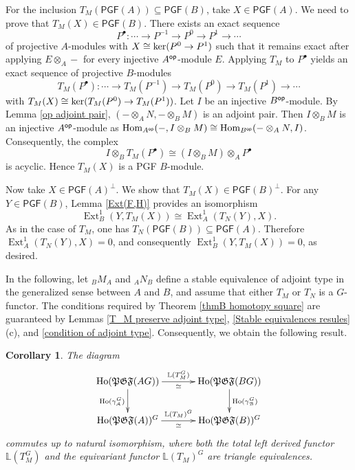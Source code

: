 \documentclass[12pt,twoside]{amsart}
\theoremstyle{bfupright head,slanted body}
\theoremstyle{bfupright head,upright body}
\theoremstyle{fixed bf head,slanted body}
\newtheorem{cor}[res]{Corollary}        \newtheorem*{cor*}{Corollary}
\theoremstyle{fixed bf head,upright body}
\theoremstyle{numbered paragraph}
\newenvironment{prf*}[1][Proof]{%
  \begin{proof}[\bf #1]
    \setcounter{equation}{0}
    \renewcommand{\theequation}{\arabic{equation}}}
  {\end{proof}
}
\numberwithin{equation}{res}
\newcommand{\calA}{\mathcal{A}}
\newcommand{\calB}{\mathcal{B}}
\newcommand{\PGF}{\mathsf{PGF}}
\newcommand{\Ho}{\mathrm{Ho}}
\newcommand{\op}{\sf op}
\newcommand{\kernel}{\mbox{\rm ker}}
\newcommand{\Hom}{\operatorname{Hom}}
\newcommand{\Ext}{\operatorname{Ext}}
\begin{document}
\begin{prf*}
For the inclusion $T_M(\PGF(A)) \subseteq \PGF(B)$, take $X \in \PGF(A)$.
We need to prove that $T_M(X) \in \PGF(B)$.
There exists an exact sequence
\[
P^\bullet: \cdots \to P^{-1} \to P^0 \to P^1 \to \cdots
\]
of projective $A$-modules with $X \cong \kernel(P^0 \to P^1)$ such that it remains exact after applying $E\otimes_A-$ for every injective $A^{\op}$-module $E$.
Applying $T_M$ to $P^\bullet$ yields an exact sequence of projective $B$-modules
\[
T_M(P^\bullet): \cdots \to T_M(P^{-1}) \to T_M(P^0) \to T_M(P^1) \to \cdots
\]
with $T_M(X) \cong \kernel(T_M(P^0) \to T_M(P^1))$.
Let $I$ be an injective $B^{\op}$-module.
By Lemma \ref{op adjoint pair}, $(- \otimes_A N, - \otimes_B M)$ is an adjoint pair.
Then $I\otimes_BM$ is an injective $A^{\op}$-module as $\Hom_{A^{\op}}(-, I \otimes_B M) \cong \Hom_{B^{\op}}(- \otimes_A N, I)$.
Consequently, the complex
\[
I \otimes_B T_M(P^\bullet) \cong (I \otimes_B M) \otimes_A P^\bullet
\]
is acyclic.
Hence $T_M(X)$ is a PGF $B$-module.

Now take $X \in \PGF(A)^\bot$.
We show that $T_M(X) \in \PGF(B)^\bot$.
For any $Y \in \PGF(B)$, Lemma \ref{Ext(F,H)} provides an isomorphism
\[
\Ext_B^1(Y, T_M(X)) \cong \Ext_A^1(T_N(Y), X).
\]
As in the case of $T_M$, one has $T_N(\PGF(B)) \subseteq \PGF(A)$.
Therefore $\Ext_A^1(T_N(Y), X) = 0$, and consequently $\Ext_B^1(Y, T_M(X)) = 0$, as desired.
\end{prf*}

In the following, let $_BM_A$ and $_AN_B$ define a stable equivalence of adjoint type in the generalized sense between $A$ and $B$, and assume that either $T_M$ or $T_N$ is a $G$-functor. The conditions required by Theorem \ref{thmB homotopy square} are guaranteed by Lemmas \ref{T_M preserve adjoint type}, \ref{Stable equivalences resules}(c), and \ref{condition of adjoint type}. Consequently, we obtain the following result.

\begin{cor} \label{homotopy square for adjoint type}
The diagram
\[
\xymatrix@C=1.2CM{
   \Ho(\mathfrak{PGF}(AG))   \ar[d]_{\Ho(\gamma_\calA^G)}^{ }  \ar[r]^{\mathbb{L}(T_M^G)}_{\simeq}
&  \Ho(\mathfrak{PGF}(BG))   \ar[d]^{\Ho(\gamma_\calB^G)}_{ }             \\
   \Ho(\mathfrak{PGF}(A))^G                              \ar[r]^{\mathbb{L}(T_M)^G}_{\simeq}
&  \Ho(\mathfrak{PGF}(B))^G                                          }
\]
commutes up to natural isomorphism, where both the total left derived functor $\mathbb{L}(T_M^G)$ and the equivariant functor $\mathbb{L}(T_M)^G$ are triangle equivalences.
\end{cor}
\end{document}
